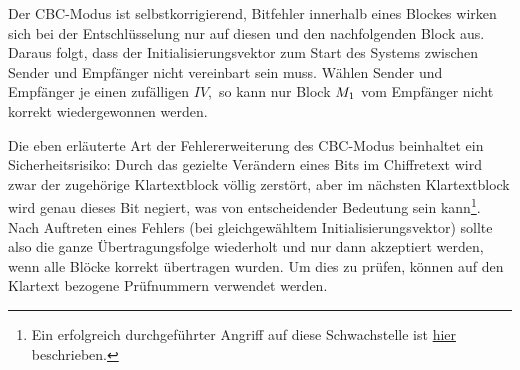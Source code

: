 Der CBC-Modus ist selbstkorrigierend, Bitfehler innerhalb eines Blockes wirken sich bei der Entschlüsselung nur auf diesen und den nachfolgenden
Block aus. Daraus folgt, dass der Initialisierungsvektor zum Start des Systems zwischen Sender und Empfänger nicht vereinbart sein muss. Wählen Sender und
Empfänger je einen zufälligen $IV,$ so kann nur Block $M_1$ vom Empfänger nicht korrekt wiedergewonnen werden.

Die eben erläuterte Art der Fehlererweiterung des CBC-Modus beinhaltet ein Sicherheitsrisiko: Durch das gezielte Verändern eines Bits im Chiffretext wird zwar
der zugehörige Klartextblock völlig zerstört, aber im nächsten Klartextblock wird genau dieses Bit negiert, was von entscheidender Bedeutung sein kann\footnote{Ein erfolgreich durchgeführter Angriff auf diese Schwachstelle ist  \href{http://www.heise.de/security/artikel/Erfolgreicher-Angriff-auf-Linux-Verschluesselung-2072199.html}{hier} beschrieben.}.
Nach Auftreten eines Fehlers (bei gleichgewähltem Initialisierungsvektor) sollte also die ganze Übertragungsfolge wiederholt und nur dann akzeptiert werden, wenn alle Blöcke korrekt übertragen wurden.
Um dies zu prüfen, können auf den Klartext bezogene Prüfnummern verwendet werden.

